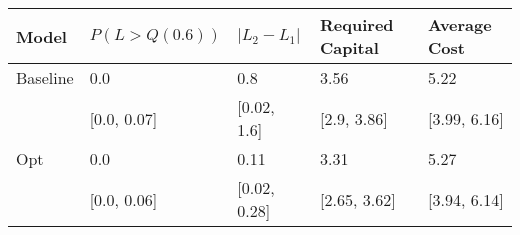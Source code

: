 \begin{tabular}{lllll}
\toprule
    Model & $P(L > Q(0.6))$ & $|L_2 - L_1|$ & Required Capital &  Average Cost \\
\midrule
 Baseline &             0.0 &           0.8 &             3.56 &          5.22 \\
          &     [0.0, 0.07] &   [0.02, 1.6] &      [2.9, 3.86] &  [3.99, 6.16] \\
      Opt &             0.0 &          0.11 &             3.31 &          5.27 \\
          &     [0.0, 0.06] &  [0.02, 0.28] &     [2.65, 3.62] &  [3.94, 6.14] \\
\bottomrule
\end{tabular}
